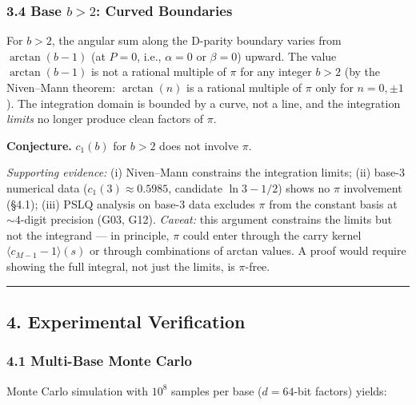 \documentclass[
  11pt,
]{article}
\begin{document}
\subsubsection{\texorpdfstring{3.4 Base \(b > 2\): Curved
Boundaries}{3.4 Base b \textgreater{} 2: Curved Boundaries}}\label{base-b-2-curved-boundaries}

For \(b > 2\), the angular sum along the D-parity boundary varies from
\(\arctan(b-1)\) (at \(P = 0\), i.e., \(\alpha = 0\) or \(\beta = 0\)) upward.
The value \(\arctan(b-1)\) is not a rational multiple of \(\pi\) for any integer
\(b > 2\) (by the Niven--Mann theorem: \(\arctan(n)\) is a rational multiple of
\(\pi\) only for \(n = 0, \pm 1\)). The integration domain is bounded by a
curve, not a line, and the integration \emph{limits} no longer produce clean
factors of \(\pi\).

\textbf{Conjecture.} \(c_1(b)\) for \(b > 2\) does not involve \(\pi\).

\emph{Supporting evidence:} (i) Niven--Mann constrains the integration limits;
(ii) base-3 numerical data (\(c_1(3) \approx 0.5985\), candidate
\(\ln 3 - 1/2\)) shows no \(\pi\) involvement (§4.1); (iii) PSLQ analysis on
base-3 data excludes \(\pi\) from the constant basis at \({\sim}4\)-digit
precision (G03, G12). \emph{Caveat:} this argument constrains the limits but not
the integrand --- in principle, \(\pi\) could enter through the carry kernel
\(\langle c_{M-1} - 1 \rangle(s)\) or through combinations of arctan values. A
proof would require showing the full integral, not just the limits, is
\(\pi\)-free.

\begin{center}\rule{0.5\linewidth}{0.5pt}\end{center}

\newpage

\subsection{4. Experimental Verification}\label{experimental-verification}

\subsubsection{4.1 Multi-Base Monte Carlo}\label{multi-base-monte-carlo}

Monte Carlo simulation with \(10^8\) samples per base (\(d = 64\)-bit factors)
yields:
\end{document}
